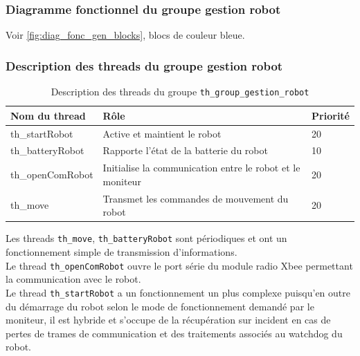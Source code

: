 \documentclass[11pt, a4paper]{paper}
\begin{document}
\subsubsection{Diagramme fonctionnel du groupe gestion robot}

Voir \ref{fig:diag_fonc_gen_blocks}, {\color{blue} blocs de couleur bleue}.

\subsubsection{Description des threads du groupe gestion robot}


\begin{table}[H]
\begin{center}
\begin{tabular}{|p{3cm}|p{8.5cm}|p{2cm}|}
\hline
\bf Nom du thread &	\bf Rôle &	\bf Priorité \\
\hline
\hline

th\_startRobot & Active et maintient le robot & 20\\
\hline
th\_batteryRobot & Rapporte l'état de la batterie du robot & 10\\
\hline
th\_openComRobot & Initialise la communication entre le robot et le moniteur & 20\\
\hline
th\_move & Transmet les commandes de mouvement du robot &	20\\
\hline
\end{tabular}
\end{center}
\caption{Description des threads du groupe {\tt th\_group\_gestion\_robot}}
\label{tab:gt_robot}
\end{table}

Les threads {\tt th\_move}, {\tt th\_batteryRobot} sont périodiques et ont un fonctionnement simple de transmission d'informations.\\

Le thread {\tt th\_openComRobot} ouvre le port série du module radio Xbee permettant la communication avec le robot.\\

Le thread {\tt th\_startRobot} a un fonctionnement un plus complexe puisqu'en outre du démarrage du robot selon le mode de fonctionnement demandé par le moniteur, il est hybride et s'occupe de la récupération sur incident en cas de pertes de trames de communication et des traitements associés au watchdog du robot.
\end{document}
